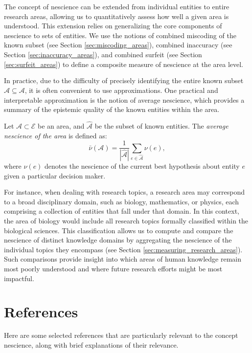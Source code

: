 The concept of nescience can be extended from individual entities to entire research areas, allowing us to quantitatively assess how well a given area is understood. This extension relies on generalizing the core components of nescience to sets of entities. We use the notions of combined miscoding of the known subset (see Section \ref{sec:miscoding_areas}), combined inaccuracy (see Section \ref{sec:inaccuracy_areas}), and combined surfeit (see Section \ref{sec:surfeit_areas}) to define a composite measure of nescience at the area level.

In practice, due to the difficulty of precisely identifying the entire known subset $\hat{\mathcal{A}} \subseteq \mathcal{A}$, it is often convenient to use approximations. One practical and interpretable approximation is the notion of average nescience, which provides a summary of the epistemic quality of the known entities within the area.

\begin{definition}
Let $\mathcal{A} \subset \mathcal{E}$ be an area, and $\hat{\mathcal{A}}$ be the subset of known entities. The \emph{average nescience of the area} is defined as:
\[
\bar{\nu}(\mathcal{A}) = \frac{1}{|\hat{\mathcal{A}}|} \sum_{e \in \hat{\mathcal{A}}} \nu(e),
\]
where $\nu(e)$ denotes the nescience of the current best hypothesis about entity $e$ given a particular decision maker.
\end{definition}

For instance, when dealing with research topics, a research area may correspond to a broad disciplinary domain, such as biology, mathematics, or physics, each comprising a collection of entities that fall under that domain. In this context, the area of biology would include all research topics formally classified within the biological sciences. This classification allows us to compute and compare the nescience of distinct knowledge domains by aggregating the nescience of the individual topics they encompass (see Section \ref{sec:measuring_research_areas}). Such comparisons provide insight into which areas of human knowledge remain most poorly understood and where future research efforts might be most impactful.

%
%

\section*{References}

Here are some selected references that are particularly relevant to the concept nescience, along with brief explanations of their relevance.


